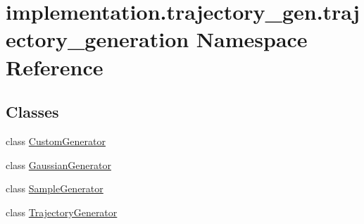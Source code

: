 \hypertarget{namespaceimplementation_1_1trajectory__gen_1_1trajectory__generation}{}\section{implementation.\+trajectory\+\_\+gen.\+trajectory\+\_\+generation Namespace Reference}
\label{namespaceimplementation_1_1trajectory__gen_1_1trajectory__generation}
\subsection*{Classes}
\begin{DoxyCompactItemize}
\item 
class \hyperlink{classimplementation_1_1trajectory__gen_1_1trajectory__generation_1_1_custom_generator}{Custom\+Generator}
\item 
class \hyperlink{classimplementation_1_1trajectory__gen_1_1trajectory__generation_1_1_gaussian_generator}{Gaussian\+Generator}
\item 
class \hyperlink{classimplementation_1_1trajectory__gen_1_1trajectory__generation_1_1_sample_generator}{Sample\+Generator}
\item 
class \hyperlink{classimplementation_1_1trajectory__gen_1_1trajectory__generation_1_1_trajectory_generator}{Trajectory\+Generator}
\end{DoxyCompactItemize}
